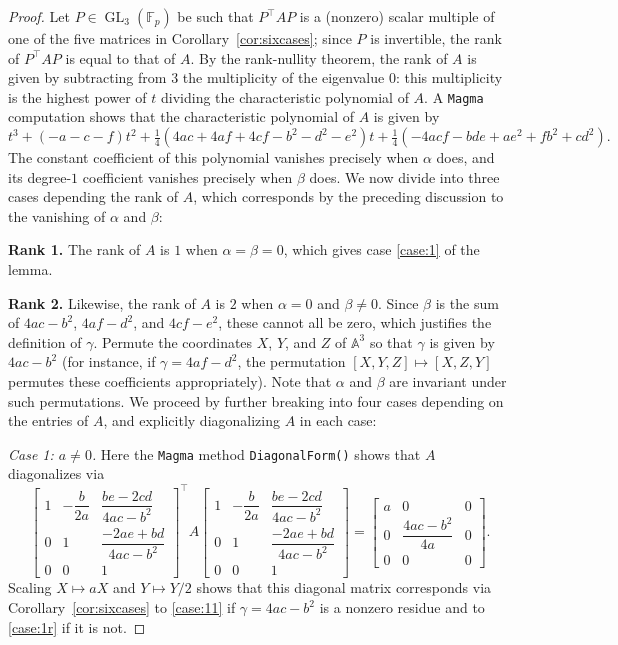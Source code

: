 \documentclass[10pt,a4paper]{amsart}
\numberwithin{equation}{section}
\numberwithin{figure}{section}
\numberwithin{table}{section}
\theoremstyle{definition}
\theoremstyle{plain}
\theoremstyle{remark}
\theoremstyle{plain}
\theoremstyle{definition}
\theoremstyle{plain}
\theoremstyle{plain}
\newcommand{\A}{\mathbb{A}}
\newcommand{\F}{\mathbb{F}}
\newcommand{\GL}{\operatorname{GL}}
\newcommand{\trsp}[1]{{{#1}^{\top}\!\!}}
\begin{document}
	\begin{proof}
		Let $P\in\GL_3(\F_p)$ be such that $\trsp{P}AP$ is a (nonzero) scalar multiple of one of the five matrices in Corollary~\ref{cor:sixcases}; since $P$ is invertible, the rank of $\trsp{P}AP$ is equal to that of $A$. By the rank-nullity theorem, the rank of $A$ is given by subtracting from $3$ the multiplicity of the eigenvalue $0$: this multiplicity is the highest power of $t$ dividing the characteristic polynomial of $A$. A \texttt{Magma} computation shows that the characteristic polynomial of $A$ is given by
		\begin{equation*}
		t^3+(-a-c-f)t^2+\tfrac{1}{4}(4ac+4af+4cf-b^2-d^2-e^2)t+\tfrac{1}{4}(-4acf - bde + ae^2 + fb^2 + cd^2).
		\end{equation*}
        The constant coefficient of this polynomial vanishes precisely when $\alpha$ does, and its degree-$1$ coefficient vanishes precisely when $\beta$ does. We now divide into three cases depending the rank of $A$, which corresponds by the preceding discussion to the vanishing of $\alpha$ and $\beta$:

		\textbf{Rank 1.} The rank of $A$ is $1$ when $\alpha=\beta=0$, which gives case \eqref{case:1} of the lemma.
		
		\textbf{Rank 2.} Likewise, the rank of $A$ is $2$ when $\alpha=0$ and $\beta\ne 0$. Since $\beta$ is the sum of $4ac-b^2$, $4af-d^2$, and $4cf-e^2$, these cannot all be zero, which justifies the definition of $\gamma$. Permute the coordinates $X$, $Y$, and $Z$ of $\A^3$ so that $\gamma$ is given by $4ac-b^2$ (for instance, if $\gamma=4af-d^2$, the permutation $[X,Y,Z]\mapsto[X,Z,Y]$ permutes these coefficients appropriately). Note that $\alpha$ and $\beta$ are invariant under such permutations. We proceed by further breaking into four cases depending on the entries of $A$, and explicitly diagonalizing $A$ in each case:

\emph{Case 1: $a\ne 0$.} Here the \texttt{Magma} method \texttt{DiagonalForm()} shows that $A$ diagonalizes via
		\begin{equation*}
		\begin{bmatrix}
		1 & -\dfrac{b}{2a} & \dfrac{be - 2cd}{4ac - b^2}\\
		0 & 1 & \dfrac{-2ae + bd}{4ac - b^2} \\
		0 & 0 & 1
		\end{bmatrix}^\top\!
		A
		\begin{bmatrix}
		1 & -\dfrac{b}{2a} & \dfrac{be - 2cd}{4ac - b^2}\\
		0 & 1 & \dfrac{-2ae + bd}{4ac - b^2} \\
		0 & 0 & 1
		\end{bmatrix}
		=
		\begin{bmatrix}
		a&0&0\\
		0&\dfrac{4ac-b^2}{4a}&0\\
		0&0&0
		\end{bmatrix}.
		\end{equation*}
		Scaling $X\mapsto aX$ and $Y\mapsto Y/2$ shows that this diagonal matrix corresponds via Corollary~\ref{cor:sixcases} to \eqref{case:11} if $\gamma=4ac-b^2$ is a nonzero residue and to \eqref{case:1r} if it is not.


\end{proof}
\end{document}
